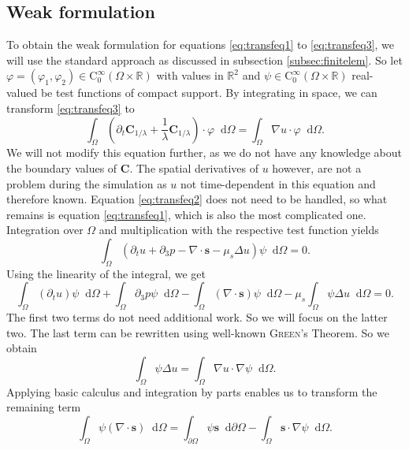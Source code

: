 \documentclass[12pt,a4paper,twoside, open=right]{scrreprt}
\theoremstyle{definition}
\theoremstyle{plain}
\newcommand{\rr}{\mathbb{R}}
\newcommand{\bfs}{\bm{s}}
\newcommand{\bfC}{\bm{C}}
\newcommand{\D}{\mathop{}\!\mathrm{d}}
\begin{document}
\subsection{Weak formulation}
To obtain the weak formulation for equations \eqref{eq:transfeq1} to \eqref{eq:transfeq3}, we will use the standard approach as discussed in subsection \ref{subsec:finitelem}. So let $\varphi = (\varphi_1,\varphi_2)\in \mathrm{C}^\infty_0(\Omega\times\rr)$ with values in $\rr^2$ and $\psi\in \mathrm{C}^\infty_0(\Omega\times\rr)$ real-valued be test functions of compact support. By integrating in space, we can transform \eqref{eq:transfeq3} to 
\begin{equation}
    \int_\Omega(\partial_t\bfC_{1/\lambda}+\frac{1}{\lambda}\bfC_{1/\lambda})\cdot\varphi\D\Omega = 
   \int_\Omega \nabla u\cdot \varphi\D\Omega.
\end{equation}
We will not modify this equation further, as we do not have any knowledge about the boundary values of $\bfC$. The spatial derivatives of $u$ however, are not a problem during the simulation as $u$ not time-dependent in this equation and therefore known. Equation \eqref{eq:transfeq2} does not need to be handled, so what remains is equation \eqref{eq:transfeq1}, which is also the most complicated one. Integration over $\Omega$ and multiplication with the respective test function yields
\begin{equation}
    \int_\Omega(\partial_t u + \partial_3 p -\nabla\cdot \bfs -\mu_s\Delta u)\psi\D\Omega = 0.
\end{equation}
Using the linearity of the integral, we get
\begin{equation}
    \int_\Omega(\partial_t u)\psi\D\Omega +\int_\Omega\partial_3 p\psi\D\Omega -\int_\Omega(\nabla\cdot \bfs)\psi\D\Omega -\mu_s\int_\Omega\psi\Delta u\D\Omega=0.
\end{equation}
The first two terms do not need additional work. So we will focus on the latter two. The last term can be rewritten using well-known \textsc{Green}'s Theorem. So we obtain
\begin{equation}
    \int_\Omega \psi\Delta u = \int_\Omega\nabla u\cdot \nabla\psi\D\Omega.
\end{equation}
Applying basic calculus and integration by parts enables us to transform the remaining term
\begin{equation}
    \int_\Omega \psi(\nabla\cdot\bfs)\D\Omega =\int_{\partial\Omega}\psi\bfs\D\partial\Omega -\int_\Omega\bfs\cdot\nabla\psi\D\Omega.
\end{equation}
\end{document}
